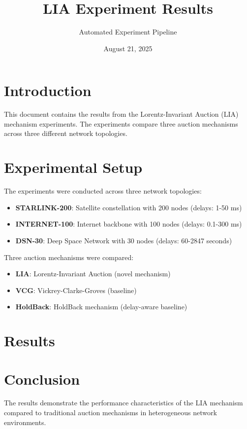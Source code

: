 \documentclass{article}
\title{LIA Experiment Results}
\author{Automated Experiment Pipeline}
\date{August 21, 2025}
\begin{document}
\maketitle
\section{Introduction}
This document contains the results from the Lorentz-Invariant Auction (LIA) mechanism experiments. The experiments compare three auction mechanisms across three different network topologies.\n\n\section{Experimental Setup}
The experiments were conducted across three network topologies:
\begin{itemize}
\item \textbf{STARLINK-200}: Satellite constellation with 200 nodes (delays: 1-50 ms)
\item \textbf{INTERNET-100}: Internet backbone with 100 nodes (delays: 0.1-300 ms)
\item \textbf{DSN-30}: Deep Space Network with 30 nodes (delays: 60-2847 seconds)
\end{itemize}
Three auction mechanisms were compared:
\begin{itemize}
\item \textbf{LIA}: Lorentz-Invariant Auction (novel mechanism)
\item \textbf{VCG}: Vickrey-Clarke-Groves (baseline)
\item \textbf{HoldBack}: HoldBack mechanism (delay-aware baseline)
\end{itemize}
\section{Results}

\section{Conclusion}
The results demonstrate the performance characteristics of the LIA mechanism compared to traditional auction mechanisms in heterogeneous network environments.
\end{document}
